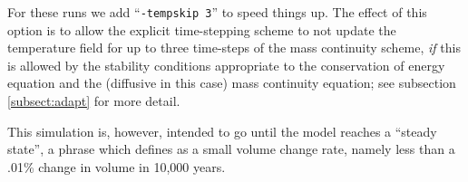 \documentclass[11pt,final]{amsart}
\begin{document}
For these runs we add ``\verb|-tempskip 3|'' to speed things up.  The effect of this option is to allow the explicit time-stepping scheme to not update the temperature field for up to three time-steps of the mass continuity scheme, \emph{if} this is allowed by the stability conditions appropriate to the conservation of energy equation and the (diffusive in this case) mass continuity equation; see subsection \ref{subsect:adapt} for more detail.

This simulation is, however, intended to go until the model reaches a ``steady state'', a phrase which \cite{RitzEISMINT} defines as a small volume change rate, namely less than a .01\% change in volume in 10,000 years.

\end{document}

